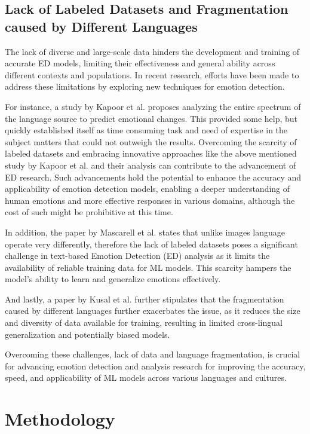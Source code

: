 \documentclass[11pt]{article}
\begin{document}
\subsection{Lack of Labeled Datasets and Fragmentation caused by Different Languages}
The lack of diverse and large-scale data hinders the development and training of accurate ED models, limiting their effectiveness and general ability across different contexts and populations. In recent research, efforts have been made to address these limitations by exploring new techniques for emotion detection.

For instance, a study by Kapoor\cite{KAPOOR2023120882} et al. proposes analyzing the entire spectrum of the language source to predict emotional changes. This provided some help, but quickly established itself as time consuming task and need of expertise in the subject matters that could not outweigh the results. Overcoming the scarcity of labeled datasets and embracing innovative approaches like the above mentioned study by Kapoor\cite{KAPOOR2023120882} et al. and their analysis can contribute to the advancement of ED research. Such advancements hold the potential to enhance the accuracy and applicability of emotion detection models, enabling a deeper understanding of human emotions and more effective responses in various domains, although the cost of such might be prohibitive at this time.

In addition, the paper by Mascarell\cite{mascarell-etal-2021-stance} et al. states that unlike images language operate very differently, therefore the lack of labeled datasets poses a significant challenge in text-based Emotion Detection (ED) analysis as it limits the availability of reliable training data for ML models. This scarcity hampers the model's ability to learn and generalize emotions effectively.

And lastly, a paper by Kusal et al. further stipulates \cite{kusal} that the fragmentation caused by different languages further exacerbates the issue, as it reduces the size and diversity of data available for training, resulting in limited cross-lingual generalization and potentially biased models.

Overcoming these challenges, lack of data and language fragmentation, is crucial for advancing emotion detection and analysis research for improving the accuracy, speed, and applicability of ML models across various languages and cultures.

\clearpage
\section{Methodology}
\end{document}
